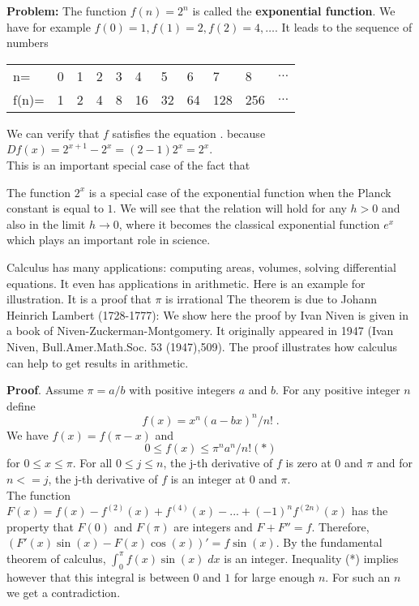 \documentclass[12pt]{amsart}
\newcounter{example}    \def\example#1{ \item \fontsize{12}{15} \selectfont #1 \fontsize{12}{15} \selectfont }
\begin{document}
{\bf Problem:} 
The function $f(n) = 2^n$ is called the {\bf exponential function}.
We have for example $f(0) =1, f(1)=2,f(2)=4, \dots $. It leads to the sequence of numbers
\begin{center}
\begin{tabular}{lllllllllll}
n=   &   0 & 1 & 2 & 3 & 4  & 5  & 6  & 7   & 8   & $\dots$ \\
f(n)=&   1 & 2 & 4 & 8 & 16 & 32 & 64 & 128 & 256 & $\dots$ \\
\end{tabular}
\end{center}
We can verify that $f$ satisfies the equation .
because $Df(x) = 2^{x+1} - 2^{x} = (2-1) 2^{x} = 2^{x}$. \\
This is an important special case of the fact that 
\begin{center}
\end{center}
The function $2^x$ is a special case of the exponential function when the Planck constant is equal to $1$. 
We will see that the relation will hold for any $h>0$ and also in the limit $h \to 0$, where it 
becomes the classical exponential function $e^x$ which plays an important role in science. 

\begin{comment}
DD[s_]:=Table[s[[k]]-s[[k-1]],{k,2,Length[s]}]; 
SS[s_]:=Table[Sum[s[[k]],{k,1,n}],{n,1,Length[s]}]; 
s=Table[2^n,{n,10}]; SS[s]+s[[1]]
\end{comment}

Calculus has many applications: computing areas, volumes, solving differential equations.
It even has applications in arithmetic. Here is an example for illustration. 
It is a proof that $\pi$ is irrational
The theorem is due to Johann Heinrich Lambert (1728-1777):
We show here the proof by Ivan Niven is given in a book of Niven-Zuckerman-Montgomery.
It originally appeared in 1947 (Ivan Niven, Bull.Amer.Math.Soc. 53 (1947),509).
The proof illustrates how calculus can help to get results in arithmetic. 

{\bf Proof}. Assume $\pi = a/b$ with positive integers $a$ and $b$.
For any positive integer $n$ define
$$ f(x) = x^n (a-b x)^n/n!  \; . $$
We have $f(x) = f(\pi-x)$ and
$$ 0 \leq  f(x) \leq  \pi^n a^n/n!  (*) $$
for $0 \leq x \leq \pi$. For all $0 \leq j \leq n$, the j-th derivative of $f$
is zero at $0$ and $\pi$ and for $n <= j$, the j-th derivative of $f$
is an integer at $0$ and $\pi$. \\
The function $F(x) = f(x) - f^{(2)}(x) + f^{(4)}(x)  - ...  + (-1)^n f^{(2n)}(x)$
has the property that $F(0)$ and $F(\pi)$ are integers and $F + F '' = f$. Therefore,
$(F'(x) \sin(x) - F(x) \cos(x))' = f \sin(x)$.
By the fundamental theorem of calculus, $\int_0^{\pi} f(x) \sin(x) \; dx$ is an integer.
Inequality (*) implies however that this integral is between 0 and $1$ for large enough $n$.
For such an $n$ we get a contradiction.
\end{document}

